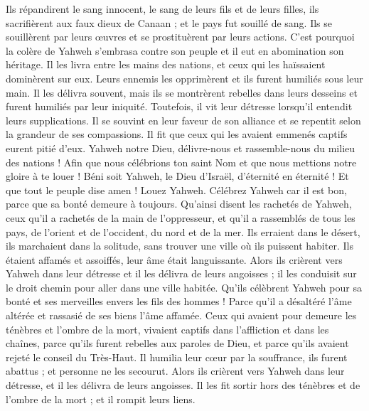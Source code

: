 \begin{multicols}{2}
Ils répandirent le sang innocent, le sang de leurs fils et de leurs filles, ils sacrifièrent aux faux dieux de Canaan ; et le pays fut souillé de sang.
Ils se souillèrent par leurs œuvres et se prostituèrent par leurs actions.
C'est pourquoi la colère de Yahweh s'embrasa contre son peuple et il eut en abomination son héritage.
Il les livra entre les mains des nations, et ceux qui les haïssaient dominèrent sur eux.
Leurs ennemis les opprimèrent et ils furent humiliés sous leur main.
Il les délivra souvent, mais ils se montrèrent rebelles dans leurs desseins et furent humiliés par leur iniquité.
Toutefois, il vit leur détresse lorsqu’il entendit leurs supplications.
Il se souvint en leur faveur de son alliance et se repentit selon la grandeur de ses compassions.
Il fit que ceux qui les avaient emmenés captifs eurent pitié d'eux.
Yahweh notre Dieu, délivre-nous et rassemble-nous du milieu des nations ! Afin que nous célébrions ton saint Nom et que nous mettions notre gloire à te louer !
Béni soit Yahweh, le Dieu d'Israël, d’éternité en éternité ! Et que tout le peuple dise amen ! Louez Yahweh.
\VerseOne{}Célébrez Yahweh car il est bon, parce que sa bonté demeure à toujours.
Qu’ainsi disent les rachetés de Yahweh, ceux qu’il a rachetés de la main de l'oppresseur,
et qu'il a rassemblés de tous les pays, de l'orient et de l’occident, du nord et de la mer.
Ils erraient dans le désert, ils marchaient dans la solitude, sans trouver une ville où ils puissent habiter.
Ils étaient affamés et assoiffés, leur âme était languissante.
Alors ils crièrent vers Yahweh dans leur détresse et il les délivra de leurs angoisses ;
il les conduisit sur le droit chemin pour aller dans une ville habitée.
Qu'ils célèbrent Yahweh pour sa bonté et ses merveilles envers les fils des hommes !
Parce qu'il a désaltéré l'âme altérée et rassasié de ses biens l'âme affamée.
Ceux qui avaient pour demeure les ténèbres et l'ombre de la mort, vivaient captifs dans l’affliction et dans les chaînes,
parce qu'ils furent rebelles aux paroles de Dieu, et parce qu'ils avaient rejeté le conseil du Très-Haut.
Il humilia leur cœur par la souffrance, ils furent abattus ; et personne ne les secourut.
Alors ils crièrent vers Yahweh dans leur détresse, et il les délivra de leurs angoisses.
Il les fit sortir hors des ténèbres et de l'ombre de la mort ; et il rompit leurs liens.

\end{multicols}
